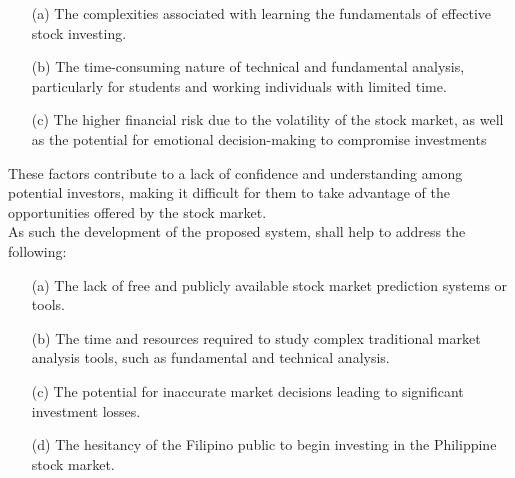 \begin{itemize}
  \item[(a)] The complexities associated with learning the fundamentals 
  of effective stock investing.
  \item[(b)] The time-consuming nature of technical and fundamental 
  analysis, particularly for students and working individuals with limited time.
  \item[(c)] The higher financial risk due to the volatility of the stock market, 
  as well as the potential for emotional decision-making to compromise investments
\end{itemize}
These factors contribute to a lack of confidence and understanding 
among potential investors, making it difficult for them to take advantage of the 
opportunities offered by the stock market.
\\As such the development of the proposed system, shall help to address the following:
\begin{itemize}
  \item[(a)] The lack of free and publicly available 
  stock market prediction systems or tools.
  \item[(b)] The time and resources required to study complex traditional 
  market analysis tools, such as fundamental and technical analysis.
  \item[(c)] The potential for inaccurate market decisions
  leading to significant investment losses.
  \item[(d)] The hesitancy of the Filipino public to begin 
  investing in the Philippine stock market.
\end{itemize}

